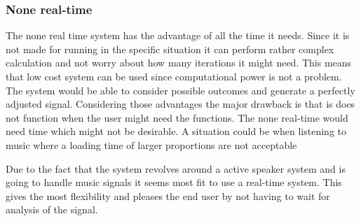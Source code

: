 \subsubsection*{None real-time}
The none real time system has the advantage of all the time it needs. Since it is not made for running in the specific situation it can perform rather complex calculation and not worry about how many iterations it might need. This means that low cost system can be used since computational power is not a problem. The system would be able to consider possible outcomes and generate a perfectly adjusted signal. Considering those advantages the major drawback is that is does not function when the user might need the functions. The none real-time would need time which might not be desirable. A situation could be when listening to music where a loading time of larger proportions are not acceptable 

Due to the fact that the system revolves around a active speaker system and is going to handle music signals it seems most fit to use a real-time system. This gives the most flexibility and pleases the end user by not having to wait for analysis of the signal.










%